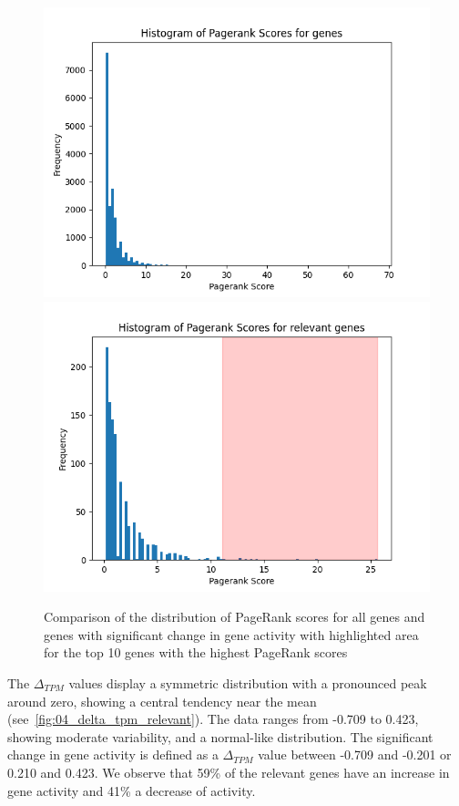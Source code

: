 \begin{figure}[h]
        \includegraphics[width=\linewidth]{figures/04_hist_pagerank}
    \endminipage
    \hfill
      \includegraphics[width=\linewidth]{figures/04_hist_pagerank_relevant}
    \endminipage
    \caption{Comparison of the distribution of PageRank scores for all genes and genes with significant change in gene activity
    with highlighted area for the top 10 genes with the highest PageRank scores}
    \label{fig:04_hist_pagerank}
\end{figure}

The $\Delta_{TPM}$ values display a symmetric distribution with a pronounced peak around zero, showing a central tendency near the mean
(see~\cref{fig:04_delta_tpm_relevant}).
The data ranges from -0.709 to 0.423, showing moderate variability, and a normal-like distribution.
The significant change in gene activity is defined as a $\Delta_{TPM}$ value between -0.709 and -0.201 or 0.210 and 0.423.
We observe that 59\% of the relevant genes have an increase in gene activity and 41\% a decrease of activity.\\

